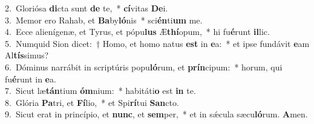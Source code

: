 {2.~}Gloriósa \textbf{di}cta sunt \textbf{de} te,~* \textbf{cí}vitas \textbf{De}i.\\
{3.~}Memor ero Rahab, et \textbf{Ba}by\textbf{ló}nis~* sci\textbf{én}ti\textbf{um} me.\\
{4.~}Ecce alienígenæ, et Tyrus, et pópu\textbf{lus} Æ\textbf{thí}opum,~* hi fu\textbf{é}runt \textbf{il}lic.\\
{5.~}Numquid Sion dicet:~† Homo, et homo natus \textbf{est} in \textbf{e}a:~* et ipse fundávit \textbf{e}am Al\textbf{tís}simus?\\
{6.~}Dóminus narrábit in scriptúris popu\textbf{ló}rum, et \textbf{prín}cipum:~* horum, qui fu\textbf{é}runt in \textbf{e}a.\\
{7.~}Sicut læ\textbf{tán}tium \textbf{óm}nium:~* habitáti\textbf{o} est \textbf{in} te.\\
{8.~}Glória \textbf{Pa}tri, et \textbf{Fí}lio,~* et Spi\textbf{rí}tui \textbf{San}cto.\\
{9.~}Sicut erat in princípio, et \textbf{nunc}, et \textbf{sem}per,~* et in sǽcula sæcu\textbf{ló}rum. \textbf{A}men.\\

